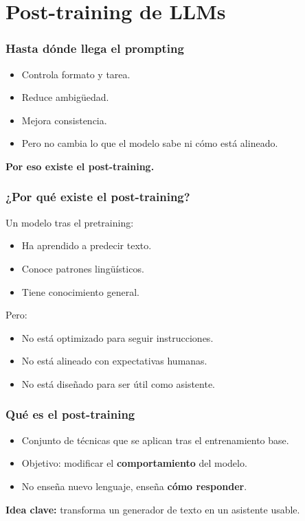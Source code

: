 \documentclass[aspectratio=169]{beamer}
\begin{document}
\section{Post-training de LLMs}
\frame{\sectionpage}

\begin{frame}\frametitle{Hasta dónde llega el prompting}
\begin{itemize}
    \item Controla formato y tarea.
    \item Reduce ambigüedad.
    \item Mejora consistencia.
    \item Pero no cambia lo que el modelo sabe ni cómo está alineado.
\end{itemize}

\textbf{Por eso existe el post-training.}
\end{frame}

\begin{frame}\frametitle{¿Por qué existe el post-training?}
Un modelo tras el pretraining:
\begin{itemize}
    \item Ha aprendido a predecir texto.
    \item Conoce patrones lingüísticos.
    \item Tiene conocimiento general.
\end{itemize}


Pero:
\begin{itemize}
    \item No está optimizado para seguir instrucciones.
    \item No está alineado con expectativas humanas.
    \item No está diseñado para ser útil como asistente.
\end{itemize}
\end{frame}

\begin{frame}\frametitle{Qué es el post-training}
\begin{itemize}
    \item Conjunto de técnicas que se aplican tras el entrenamiento base.
    \item Objetivo: modificar el \textbf{comportamiento} del modelo.
    \item No enseña nuevo lenguaje, enseña \textbf{cómo responder}.
\end{itemize}

\vspace{0.4em}
\textbf{Idea clave:} transforma un generador de texto en un asistente usable.
\end{frame}
\end{document}
